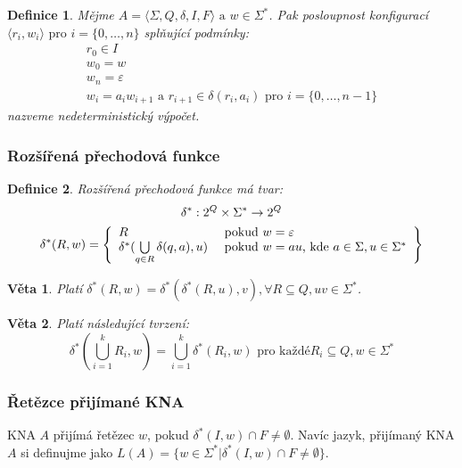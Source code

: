 \documentclass[10pt,a4paper]{article}
\theoremstyle{note}
\newtheorem{veta}{Věta}
\newtheorem{definice}{Definice}
\begin{document}
\begin{definice}
Mějme $A = \langle \Sigma, Q, \delta, I, F \rangle  \text{ a } w \in \Sigma^{*}$. Pak posloupnost konfigurací $\langle r_{i}, w_{i} \rangle \text{ pro } i = \lbrace 0, \ldots, n \rbrace $ splňující podmínky:
\begin{gather}
r_{0} \in I \\
w_{0} = w \\
w_{n} = \varepsilon \\
w_{i} = a_{i}w_{i+1} \text{ a } r_{i+1} \in \delta (r_{i}, a_{i}) \text{ pro } i = \lbrace 0, \ldots,  n-1 \rbrace
\end{gather}
nazveme \textit{nedeterministický výpočet}.
\end{definice}


\subsubsection{Rozšířená přechodová funkce}
\begin{definice}
Rozšířená přechodová funkce má tvar:
\begin{gather*}
\delta^{*} : 2^{Q} \times \Sigma^{*} \rightarrow 2^{Q} \\
\delta^{*}(R, w) = \left\lbrace
\begin{array}{l l}
R & \text{ pokud } w = \varepsilon \\
\delta^{*}(\bigcup\limits_{q \in R} \delta(q, a), u) & \text{ pokud } w = au\text{, kde } a \in \Sigma, u \in \Sigma^{*} \\
\end{array}
\right\rbrace
\end{gather*}
\end{definice}

\begin{veta}
Platí $\delta^{*}(R,w) = \delta^{*}(\delta^{*}(R,u),v), \forall R \subseteq Q, uv \in \Sigma^{*}$.
\end{veta}


\begin{veta}
Platí následující tvrzení:
$$
\delta^{*}(\bigcup\limits_{i=1}^{k} R_{i},w) = \bigcup\limits_{i=1}^{k} \delta^{*}(R_{i},w) \text{ pro každé} R_{i} \subseteq Q, w \in \Sigma^{*}
$$
\end{veta}


\subsubsection{Řetězce přijímané KNA}
KNA $A$ přijímá řetězec $w$, pokud $\delta^{*}(I,w) \cap F \neq \emptyset$.
Navíc jazyk, přijímaný KNA $A$ si definujme jako $L(A) = \lbrace w \in \Sigma^{*} | \delta^{*}(I,w) \cap F \neq \emptyset \rbrace$.
\end{document}
